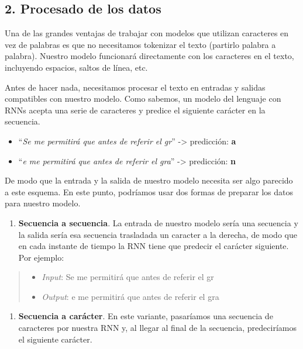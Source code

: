 \documentclass[11pt]{article}
\providecommand{\tightlist}{%
      \setlength{\itemsep}{0pt}\setlength{\parskip}{0pt}}
\begin{document}
    \subsection{2. Procesado de los datos}\label{procesado-de-los-datos}

    Una de las grandes ventajas de trabajar con modelos que utilizan
caracteres en vez de palabras es que no necesitamos tokenizar el texto
(partirlo palabra a palabra). Nuestro modelo funcionará directamente con
los caracteres en el texto, incluyendo espacios, saltos de línea, etc.

Antes de hacer nada, necesitamos procesar el texto en entradas y salidas
compatibles con nuestro modelo. Como sabemos, un modelo del lenguaje con
RNNs acepta una serie de caracteres y predice el siguiente carácter en
la secuencia.

\begin{itemize}
\tightlist
\item
  ``\emph{Se me permitirá que antes de referir el gr}'' -\textgreater{}
  predicción: \textbf{a}
\item
  ``\emph{e me permitirá que antes de referir el gra}'' -\textgreater{}
  predicción: \textbf{n}
\end{itemize}

De modo que la entrada y la salida de nuestro modelo necesita ser algo
parecido a este esquema. En este punto, podríamos usar dos formas de
preparar los datos para nuestro modelo.

\begin{enumerate}
\def\labelenumi{\arabic{enumi}.}
\tightlist
\item
  \textbf{Secuencia a secuencia}. La entrada de nuestro modelo sería una
  secuencia y la salida sería esa secuencia trasladada un caracter a la
  derecha, de modo que en cada instante de tiempo la RNN tiene que
  predecir el carácter siguiente. Por ejemplo:
\end{enumerate}

\begin{quote}
\begin{itemize}
\tightlist
\item
  \emph{Input}: Se me permitirá que antes de referir el gr
\item
  \emph{Output}: e me permitirá que antes de referir el gra
\end{itemize}
\end{quote}

\begin{enumerate}
\def\labelenumi{\arabic{enumi}.}
\setcounter{enumi}{1}
\tightlist
\item
  \textbf{Secuencia a carácter}. En este variante, pasaríamos una
  secuencia de caracteres por nuestra RNN y, al llegar al final de la
  secuencia, predeciríamos el siguiente carácter.
\end{enumerate}
\end{document}
